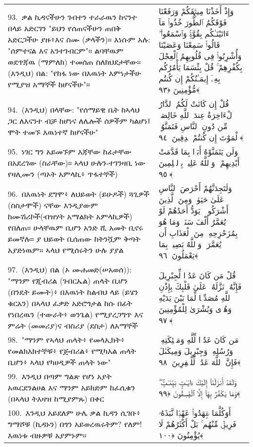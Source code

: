 \documentclass[11pt,a4paper,oneside]{article}%
\newcommand{\mytextarabic}[1]{\textarabic{ #1 \flushright}}
\begin{document}
\begin{longtable}{%
  @{}
    p{}
  @{~~~}
    p{}
    @{}
}
93.\ ቃል ኪዳናችሁን ገብተን ተራራዉን ከናንተ በላይ አድርገን "ይህን የሰጠናችሁን ጠበቅ አድርጋችሁ ያዙ፥እና ስሙ (ቃላችን)። እነሱም አሉ: "ሰምተናል እና አንተገብርም"። ልባቸዉም ወደጥጃዉ (ማምለክ) ተመሰጠ ስለክህደታቸው። (እንዲህ) በል: "የከፋ ነው በእዉነት እምነታችሁ የሚያዝ አማኞች ከሆናችሁ"። &  \mytextarabic{وَإِذْ أَخَذْنَا مِيثَٟقَكُمْ وَرَفَعْنَا فَوْقَكُمُ ٱلطُّورَ خُذُوا۟ مَآ ءَاتَيْنَـٰكُم بِقُوَّةٍۢ وَٱسْمَعُوا۟ ۖ قَالُوا۟ سَمِعْنَا وَعَصَيْنَا وَأُشْرِبُوا۟ فِى قُلُوبِهِمُ ٱلْعِجْلَ بِكُفْرِهِمْ ۚ قُلْ بِئْسَمَا يَأْمُرُكُم بِهِۦٓ إِيمَـٰنُكُمْ إِن كُنتُم مُّؤْمِنِينَ ﴿٩٣﴾}\\
94.\ (እንዲህ) በላቸው: "የሰማይዊ ቤት ከኣላህ ጋር ለእናንተ ብቻ ከሆነና ለሌሎች ሰዎችም ካልሆነ፤ ሞት ተመኙ እዉነተኛ ከሆናችሁ" &  \mytextarabic{ قُلْ إِن كَانَتْ لَكُمُ ٱلدَّارُ ٱلْءَاخِرَةُ عِندَ ٱللَّهِ خَالِصَةًۭ مِّن دُونِ ٱلنَّاسِ فَتَمَنَّوُا۟ ٱلْمَوْتَ إِن كُنتُمْ صَٟدِقِينَ ﴿٩٤﴾ }\\
95.\ ነገር ግን አይመኙም እጃቸው ከፊታቸው በአደረገው (ስራቸው)። ኣላህ ሁሉን-ተገንዛቢ ነው የዛሊሙን (ጣኦት አምላኪ፥ ጥፋተኞች) &  \mytextarabic{وَلَن يَتَمَنَّوْهُ أَبَدًۢا بِمَا قَدَّمَتْ أَيْدِيهِمْ ۗ وَٱللَّهُ عَلِيمٌۢ بِٱلظَّٟلِمِينَ ﴿٩٥﴾}\\
96.\ በእዉነት ደግሞ፥ ለህይወት (ይሁዶች) ጓጊዎች (ስስታሞች) ናቸው እንዲያውም ከሙሽሪኮች(ብዝሃት አማልክት አምላኪዎች) የበለጠ። ሁላቸዉም ቢሆን አንድ ሺ አመት ቢኖሩ ይመኛሉ። ያ ህይወት ቢሰጠው ከትንሿም ቅጣት አያድነዉም። ኣላህ የሚሰሩትን ሁሉ ያያል &  \mytextarabic{وَلَتَجِدَنَّهُمْ أَحْرَصَ ٱلنَّاسِ عَلَىٰ حَيَوٰةٍۢ وَمِنَ ٱلَّذِينَ أَشْرَكُوا۟ ۚ يَوَدُّ أَحَدُهُمْ لَوْ يُعَمَّرُ أَلْفَ سَنَةٍۢ وَمَا هُوَ بِمُزَحْزِحِهِۦ مِنَ ٱلْعَذَابِ أَن يُعَمَّرَ ۗ وَٱللَّهُ بَصِيرٌۢ بِمَا يَعْمَلُونَ ﴿٩٦﴾}\\
97.\ (እንዲህ) በል (ኦ ሙሐመድ(ሠአወሰ)): "ማንም የጂብሪል (ገብርኤል) ጠላት ቢሆን (በንዴት ይሙት)፥ በእዉነት ከልብህ ላይ (ይሄን ቁርአን) በኣላህ ፈቃድ አድሮጎታል ከሱ በፊት የነበረዉን (ተውራት፥ ወንጌል) የሚያረጋግጥ እና ምሬት (መመሪያ)ና ብስሪያ (ደስታ) ለአማኞች  &  \mytextarabic{قُلْ مَن كَانَ عَدُوًّۭا لِّجِبْرِيلَ فَإِنَّهُۥ نَزَّلَهُۥ عَلَىٰ قَلْبِكَ بِإِذْنِ ٱللَّهِ مُصَدِّقًۭا لِّمَا بَيْنَ يَدَيْهِ وَهُدًۭى وَبُشْرَىٰ لِلْمُؤْمِنِينَ ﴿٩٧﴾}\\
98.\ "ማንም የኣላህ ጠላት፥ የመላኢክት፥ የመልክእክተኞቹ፥ የጅብሪል፥ የሚካእል ጠላት ቢሆን፥ ኣላህ የካሀዲዎች ጠላት ነው" &  \mytextarabic{مَن كَانَ عَدُوًّۭا لِّلَّهِ وَمَلَٟٓئِكَتِهِۦ وَرُسُلِهِۦ وَجِبْرِيلَ وَمِيكَىٰلَ فَإِنَّ ٱللَّهَ عَدُوٌّۭ لِّلْكَٟفِرِينَ ﴿٩٨﴾}\\
99.\ እንዲህ በጣም ግልጽ የሆነ አያት አዉርደንልሀል እና ማንም አይክድም ከፈሲቁን (በኣላህ ትእዛዝ ከሚያምጹ) በቀር  &  \mytextarabic{وَلَقَدْ أَنزَلْنَآ إِلَيْكَ ءَايَـٰتٍۭ بَيِّنَـٰتٍۢ ۖ وَمَا يَكْفُرُ بِهَآ إِلَّا ٱلْفَٟسِقُونَ ﴿٩٩﴾}\\
100.\ እንዲህ አይደለም ሁሌ ቃል ኪዳን ሲገቡ፥ ግማሾቹ (ኪዳኑን) በጎን አይወረዉሩትም? የለም! እዉነቱ ብዙዎቹ አያምኑም።  &  \mytextarabic{أَوَكُلَّمَا عَٟهَدُوا۟ عَهْدًۭا نَّبَذَهُۥ فَرِيقٌۭ مِّنْهُم ۚ بَلْ أَكْثَرُهُمْ لَا يُؤْمِنُونَ ﴿١٠٠﴾}\\

\end{longtable}
\end{document}
